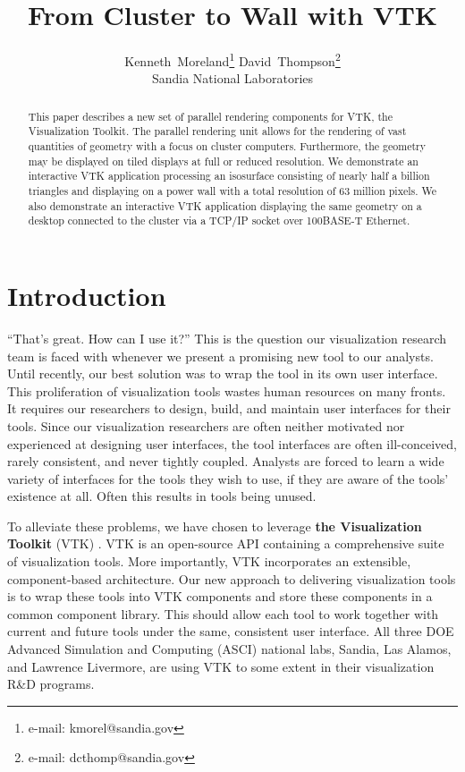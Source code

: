 \documentclass{acmsiggraph}
\title{From Cluster to Wall with VTK}
\author{Kenneth~Moreland\thanks{e-mail: kmorel@sandia.gov} \hspace{.2in}
  David~Thompson\thanks{e-mail: dcthomp@sandia.gov}
  \\ Sandia National Laboratories}
\newcommand{\keyterm}[1]{\textbf{#1}}
\begin{document}
  \maketitle

  \begin{abstract}
    This paper describes a new set of parallel rendering components for
    VTK, the Visualization Toolkit.  The parallel rendering unit allows for
    the rendering of vast quantities of geometry with a focus on cluster
    computers.  Furthermore, the geometry may be displayed on tiled
    displays at full or reduced resolution.  We demonstrate an interactive
    VTK application processing an isosurface consisting of nearly half a
    billion triangles and displaying on a power wall with a total
    resolution of 63 million pixels.  We also demonstrate an interactive
    VTK application displaying the same geometry on a desktop connected to
    the cluster via a TCP/IP socket over 100BASE-T Ethernet.
  \end{abstract}

  \begin{CRcatlist}
  \end{CRcatlist}

  \keywordlist

  \copyrightspace

  \section{Introduction}
  \label{sec:introduction}

  ``That's great.  How can I use it?''  This is the question our
  visualization research team is faced with whenever we present a promising
  new tool to our analysts.  Until recently, our best solution was to wrap
  the tool in its own user interface.  This proliferation of visualization
  tools wastes human resources on many fronts.  It requires our researchers
  to design, build, and maintain user interfaces for their tools.  Since
  our visualization researchers are often neither motivated nor experienced
  at designing user interfaces, the tool interfaces are often
  ill-conceived, rarely consistent, and never tightly coupled.  Analysts
  are forced to learn a wide variety of interfaces for the tools they wish
  to use, if they are aware of the tools' existence at all.  Often this
  results in tools being unused.

  To alleviate these problems, we have chosen to leverage \keyterm{the
  Visualization Toolkit} (VTK) \cite{Schroeder98}.  VTK is an open-source
  API containing a comprehensive suite of visualization tools.  More
  importantly, VTK incorporates an extensible, component-based
  architecture.  Our new approach to delivering visualization tools is to
  wrap these tools into VTK components and store these components in a
  common component library.  This should allow each tool to work together
  with current and future tools under the same, consistent user interface.
  All three DOE Advanced Simulation and Computing (ASCI) national labs,
  Sandia, Las Alamos, and Lawrence Livermore, are using VTK to some extent
  in their visualization R\&D programs.
\end{document}
